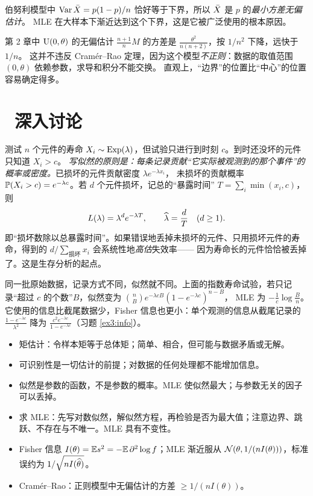 伯努利模型中 $\Var\Xbar=p(1-p)/n$ 恰好等于下界，所以 $\Xbar$ 是 $p$ 的\emph{最小方差无偏估计}。
MLE 在大样本下渐近达到这个下界，这是它被广泛使用的根本原因。

\begin{intuition}[均匀分布为什么能“打破”下界]
第 2 章中 $\Unif(0,\theta)$ 的无偏估计 $\frac{n+1}nM$ 的方差是 $\frac{\theta^2}{n(n+2)}$，按 $1/n^2$ 下降，远快于 $1/n$。
这并不违反 Cramér–Rao 定理，因为这个模型\emph{不正则}：数据的取值范围 $(0,\theta)$ 依赖参数，求导和积分不能交换。
直观上，“边界”的位置比“中心”的位置容易确定得多。
\end{intuition}

\section{\starmark\ 深入讨论}

\begin{deeper}
测试 $n$ 个元件的寿命 $X_i\sim\Exp(\lambda)$，但试验只进行到时刻 $c$。到时还没坏的元件只知道 $X_i>c$。
\emph{写似然的原则是：每条记录贡献“它实际被观测到的那个事件”的概率或密度。}已损坏的元件贡献密度 $\lambda e^{-\lambda x_i}$，
未损坏的贡献概率 $\P(X_i>c)=e^{-\lambda c}$。若 $d$ 个元件损坏，记总的“暴露时间” $T=\sum_i\min(x_i,c)$，则
\[
L(\lambda)=\lambda^de^{-\lambda T},\qquad \hatt\lambda=\frac dT\quad(d\ge1).
\]
即“损坏数除以总暴露时间”。如果错误地丢掉未损坏的元件、只用损坏元件的寿命，得到的 $d/\sum_{\text{损坏}}x_i$ 会系统性地\emph{高估}失效率——
因为寿命长的元件恰恰被丢掉了。这是生存分析的起点。
\end{deeper}

\begin{deeper}
同一批原始数据，记录方式不同，似然就不同。上面的指数寿命试验，若只记录“超过 $c$ 的个数”$B$，似然变为 $\binom nB e^{-\lambda cB}(1-e^{-\lambda c})^{n-B}$，
MLE 为 $-\frac1c\log\frac Bn$。它使用的信息比截尾数据少，Fisher 信息也更小：单个观测的信息从截尾记录的 $\frac{1-e^{-\lambda c}}{\lambda^2}$
降为 $\frac{c^2e^{-\lambda c}}{1-e^{-\lambda c}}$（习题 \ref{ex3:info}）。
\end{deeper}

\begin{summary}
\begin{itemize}
\item 矩估计：令样本矩等于总体矩；简单、相合，但可能与数据矛盾或无解。
\item 可识别性是一切估计的前提；对数据的任何处理都不能增加信息。
\item 似然是参数的函数，不是参数的概率。MLE 使似然最大；与参数无关的因子可以丢掉。
\item 求 MLE：先写对数似然，解似然方程，再检验是否为最大值；注意边界、跳跃、不存在与不唯一。MLE 具有不变性。
\item Fisher 信息 $I(\theta)=\E s^2=-\E\,\partial^2\log f$；MLE 渐近服从 $\N(\theta,1/(nI(\theta)))$，标准误约为 $1/\sqrt{nI(\hatt\theta)}$。
\item Cramér–Rao：正则模型中无偏估计的方差 $\ge1/(nI(\theta))$。
\end{itemize}
\end{summary}

